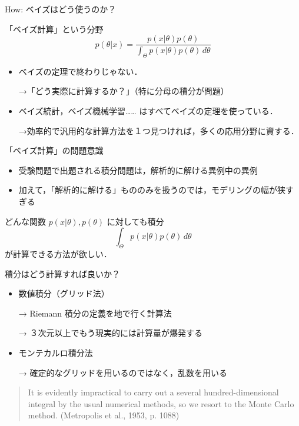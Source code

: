 \documentclass[
  ignorenonframetext,
]{beamer}
\begin{document}
\begin{frame}{How: ベイズはどう使うのか？}
\label{how-ux30d9ux30a4ux30baux306fux3069ux3046ux4f7fux3046ux306eux304b}
\begin{block}{「ベイズ計算」という分野}
\label{ux30d9ux30a4ux30baux8a08ux7b97ux3068ux3044ux3046ux5206ux91ce}
\[
p(\theta|x)=\frac{p(x|\theta)p(\theta)}{\int_\Theta p(x|\theta)p(\theta)\,d\theta}
\]

\begin{itemize}
\item
  ベイズの定理で終わりじゃない．

  →「どう実際に計算するか？」（特に分母の積分が問題）
\item
  ベイズ統計，ベイズ機械学習\ldots\ldots{}
  はすべてベイズの定理を使っている．

  →効率的で汎用的な計算方法を１つ見つければ，多くの応用分野に資する．
\end{itemize}
\end{block}

\begin{block}{「ベイズ計算」の問題意識}
\label{ux30d9ux30a4ux30baux8a08ux7b97ux306eux554fux984cux610fux8b58}
\begin{itemize}
\item
  受験問題で出題される積分問題は，解析的に解ける異例中の異例
\item
  加えて，「解析的に解ける」もののみを扱うのでは，モデリングの幅が狭すぎる
\end{itemize}

どんな関数 \(p(x|\theta),p(\theta)\) に対しても積分 \[
\int_\Theta p(x|\theta)p(\theta)\,d\theta
\] が計算できる方法が欲しい．
\end{block}

\begin{block}{積分はどう計算すれば良いか？}
\label{ux7a4dux5206ux306fux3069ux3046ux8a08ux7b97ux3059ux308cux3070ux826fux3044ux304b}
\begin{itemize}
\item
  数値積分（グリッド法）

  → Riemann 積分の定義を地で行く計算法

  → ３次元以上でもう現実的には計算量が爆発する
\item
  モンテカルロ積分法

  → 確定的なグリッドを用いるのではなく，乱数を用いる
\end{itemize}

\begin{quote}
It is evidently impractical to carry out a several hundred-dimensional
integral by the usual numerical methods, so we resort to the Monte Carlo
method. (Metropolis et al., 1953, p. 1088)
\end{quote}
\end{block}
\end{frame}
\end{document}
